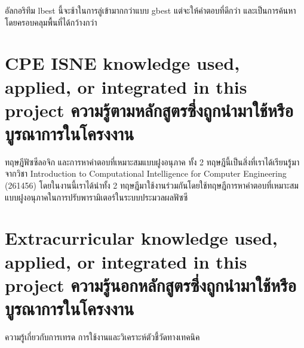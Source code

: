 อัลกอริทึม lbest นี้จะช้าในการลู่เข้ามากกว่าแบบ gbest แต่จะให้คำตอบที่ดีกว่า และเป็นการค้นหาโดยครอบคลุมพื้นที่ได้กว้างกว่า

\section{\ifenglish%
\ifcpe CPE \else ISNE \fi knowledge used, applied, or integrated in this project
\else%
ความรู้ตามหลักสูตรซึ่งถูกนำมาใช้หรือบูรณาการในโครงงาน
\fi
}

ทฤษฎีฟัซซีลอจิก และการหาคำตอบที่เหมาะสมแบบฝูงอนุภาค ทั้ง 2 ทฤษฎีนี้เป็นสิ่งที่เราได้เรียนรู้มาจากวิชา Introduction to Computational Intelligence for Computer Engineering (261456) โดยในงานนี้เราได้นำทั้ง 2 ทฤษฎีมาใช้งานร่วมกันโดยใช้ทฤษฎีการหาคำตอบที่เหมาะสมแบบฝูงอนุภาคในการปรับพารามิเตอร์ในระบบประมวลผลฟัซซี

\section{\ifenglish%
Extracurricular knowledge used, applied, or integrated in this project
\else%
ความรู้นอกหลักสูตรซึ่งถูกนำมาใช้หรือบูรณาการในโครงงาน
\fi
}

ความรู้เกี่ยวกับการเทรด การใช้งานและวิเคราะห์ตัวชี้วัดทางเทคนิค
